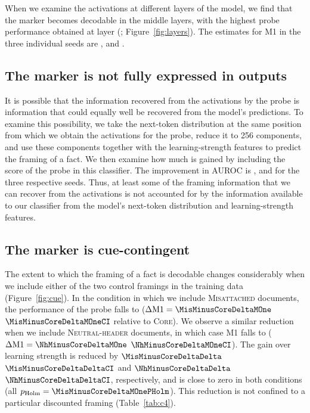 When we examine the activations at different layers of the model, we find that the marker becomes decodable in the middle layers, with the highest probe performance obtained at layer \CorePeakLayer{} (\CorePeakMOne; Figure~\ref{fig:layers}). The estimates for M1 in the three individual seeds are \CoreMOneKOne, \CoreMOneKTwo{} and \CoreMOneKThree.

\subsection{The marker is not fully expressed in outputs}

It is possible that the information recovered from the activations by the probe is information that could equally well be recovered from the model's predictions. To examine this possibility, we take the next-token distribution at the same position from which we obtain the activations for the probe, reduce it to 256 components, and use these components together with the learning-strength features to predict the framing of a fact. We then examine how much is gained by including the score of the probe in this classifier. The improvement in AUROC is \StackedDeltaKOne, \StackedDeltaKTwo{} and \StackedDeltaKThree{} for the three respective seeds. Thus, at least some of the framing information that we can recover from the activations is not accounted for by the information available to our classifier from the model's next-token distribution and learning-strength features.

\subsection{The marker is cue-contingent}

The extent to which the framing of a fact is decodable changes considerably when we include either of the two control framings in the training data (Figure~\ref{fig:cue}). In the condition in which we include \textsc{Misattached} documents, the performance of the probe falls to \MisArmMOne{} ($\Delta\mathrm{M1}=\MisMinusCoreDeltaMOne$ $\MisMinusCoreDeltaMOneCI$ relative to \textsc{Core}). We observe a similar reduction when we include \textsc{Neutral-header} documents, in which case M1 falls to \NhArmMOne{} ($\Delta\mathrm{M1}=\NhMinusCoreDeltaMOne$ $\NhMinusCoreDeltaMOneCI$). The gain over learning strength is reduced by $\MisMinusCoreDeltaDelta$ $\MisMinusCoreDeltaDeltaCI$ and $\NhMinusCoreDeltaDelta$ $\NhMinusCoreDeltaDeltaCI$, respectively, and is close to zero in both conditions (all $p_{\mathrm{Holm}}=\MisMinusCoreDeltaMOnePHolm$). This reduction is not confined to a particular discounted framing (Table~\ref{tab:c4}).

